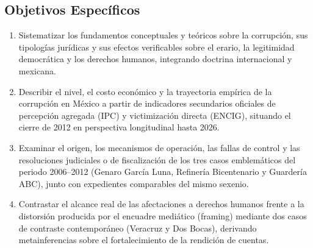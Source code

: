 \subsection{Objetivos Específicos}

\begin{enumerate}
  \item Sistematizar los fundamentos conceptuales y teóricos sobre la corrupción, sus tipologías jurídicas y sus efectos verificables sobre el erario, la legitimidad democrática y los derechos humanos, integrando doctrina internacional y mexicana.
  
  \item Describir el nivel, el costo económico y la trayectoria empírica de la corrupción en México a partir de indicadores secundarios oficiales de percepción agregada (IPC) y victimización directa (ENCIG), situando el cierre de 2012 en perspectiva longitudinal hasta 2026.
  
  \item Examinar el origen, los mecanismos de operación, las fallas de control y las resoluciones judiciales o de fiscalización de los tres casos emblemáticos del periodo 2006--2012 (Genaro García Luna, Refinería Bicentenario y Guardería ABC), junto con expedientes comparables del mismo sexenio.
  
  \item Contrastar el alcance real de las afectaciones a derechos humanos frente a la distorsión producida por el encuadre mediático (framing) mediante dos casos de contraste contemporáneo (Veracruz y Dos Bocas), derivando metainferencias sobre el fortalecimiento de la rendición de cuentas.
\end{enumerate}